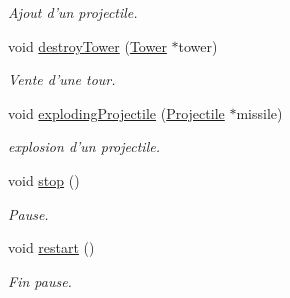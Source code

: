 \begin{DoxyCompactItemize}
\begin{DoxyCompactList}\small\item\em Ajout d'un projectile. \end{DoxyCompactList}\item 
void \hyperlink{classRender_a20678c257926bfff635fded745e11f4a}{destroyTower} (\hyperlink{classTower}{Tower} $\ast$tower)
\begin{DoxyCompactList}\small\item\em Vente d'une tour. \end{DoxyCompactList}\item 
void \hyperlink{classRender_aedec0cbbe4808368656b772dfe3e63f9}{explodingProjectile} (\hyperlink{classProjectile}{Projectile} $\ast$missile)
\begin{DoxyCompactList}\small\item\em explosion d'un projectile. \end{DoxyCompactList}\item 
void \hyperlink{classRender_af137a4a60ad5195b0ccd3076e160f1d4}{stop} ()
\begin{DoxyCompactList}\small\item\em Pause. \end{DoxyCompactList}\item 
void \hyperlink{classRender_a071e49ad740ed2bd509f31c68d37acd8}{restart} ()
\begin{DoxyCompactList}\small\item\em Fin pause. \end{DoxyCompactList}\end{DoxyCompactItemize}
